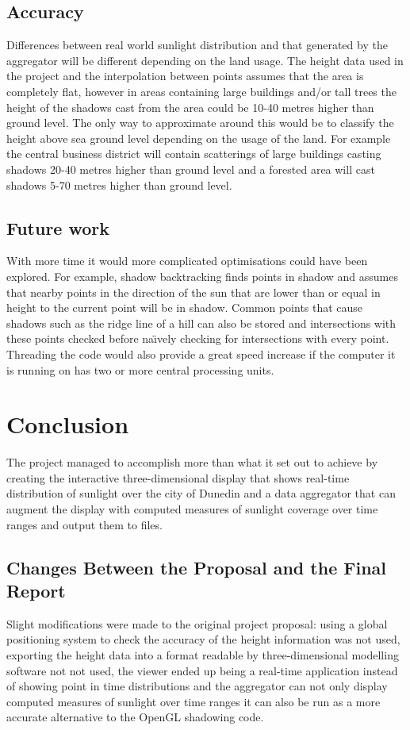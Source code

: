 \documentclass[12pt]{report}
\begin{document}
\section{Accuracy}
Differences between real world sunlight distribution and that generated by the aggregator will be different depending on the land usage. The height data used in the project and the interpolation between points assumes that the area is completely flat, however in areas containing large buildings and/or tall trees the height of the shadows cast from the area could be 10-40 metres higher than ground level. The only way to approximate around this would be to classify the height above sea ground level depending on the usage of the land. For example the central business district will contain scatterings of large buildings casting shadows 20-40 metres higher than ground level and a forested area will cast shadows 5-70 metres higher than ground level.

\section{Future work}
With more time it would more complicated optimisations could have been explored. For example, shadow backtracking
finds points in shadow and assumes that nearby points in the direction of the sun that are lower than or equal in height to the current point will be in shadow. Common points that cause shadows such as the ridge line of a hill can also be stored and intersections with these points checked before na\"{\i}vely checking for intersections with every point. Threading the code would also provide a great speed increase if the computer it is running on has two or more central processing units.


\chapter{Conclusion}
The project managed to accomplish more than what it set out to achieve by creating the interactive three-dimensional display that shows real-time distribution of sunlight over the city of Dunedin and a data aggregator that can augment the display with computed measures of sunlight coverage over time ranges and output them to files. 

\section{Changes Between the Proposal and the Final Report}
Slight modifications were made to the original project proposal: using a global positioning system to check the accuracy of the height information was not used, exporting the height data into a format readable by three-dimensional modelling software not not used, the viewer ended up being a real-time application instead of showing point in time distributions and the aggregator can not only display computed measures of sunlight over time ranges it can also be run as a more accurate alternative to the OpenGL shadowing code.
\end{document}
